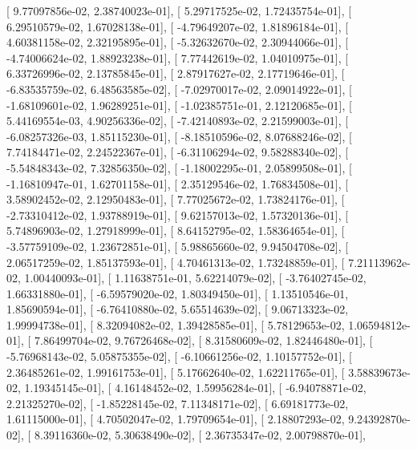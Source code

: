 \documentclass{article}
\begin{document}
       [  9.77097856e-02,   2.38740023e-01],
       [  5.29717525e-02,   1.72435754e-01],
       [  6.29510579e-02,   1.67028138e-01],
       [ -4.79649207e-02,   1.81896184e-01],
       [  4.60381158e-02,   2.32195895e-01],
       [ -5.32632670e-02,   2.30944066e-01],
       [ -4.74006624e-02,   1.88923238e-01],
       [  7.77442619e-02,   1.04010975e-01],
       [  6.33726996e-02,   2.13785845e-01],
       [  2.87917627e-02,   2.17719646e-01],
       [ -6.83535759e-02,   6.48563585e-02],
       [ -7.02970017e-02,   2.09014922e-01],
       [ -1.68109601e-02,   1.96289251e-01],
       [ -1.02385751e-01,   2.12120685e-01],
       [  5.44169554e-03,   4.90256336e-02],
       [ -7.42140893e-02,   2.21599003e-01],
       [ -6.08257326e-03,   1.85115230e-01],
       [ -8.18510596e-02,   8.07688246e-02],
       [  7.74184471e-02,   2.24522367e-01],
       [ -6.31106294e-02,   9.58288340e-02],
       [ -5.54848343e-02,   7.32856350e-02],
       [ -1.18002295e-01,   2.05899508e-01],
       [ -1.16810947e-01,   1.62701158e-01],
       [  2.35129546e-02,   1.76834508e-01],
       [  3.58902452e-02,   2.12950483e-01],
       [  7.77025672e-02,   1.73824176e-01],
       [ -2.73310412e-02,   1.93788919e-01],
       [  9.62157013e-02,   1.57320136e-01],
       [  5.74896903e-02,   1.27918999e-01],
       [  8.64152795e-02,   1.58364654e-01],
       [ -3.57759109e-02,   1.23672851e-01],
       [  5.98865660e-02,   9.94504708e-02],
       [  2.06517259e-02,   1.85137593e-01],
       [  4.70461313e-02,   1.73248859e-01],
       [  7.21113962e-02,   1.00440093e-01],
       [  1.11638751e-01,   5.62214079e-02],
       [ -3.76402745e-02,   1.66331880e-01],
       [ -6.59579020e-02,   1.80349450e-01],
       [  1.13510546e-01,   1.85690594e-01],
       [ -6.76410880e-02,   5.65514639e-02],
       [  9.06713323e-02,   1.99994738e-01],
       [  8.32094082e-02,   1.39428585e-01],
       [  5.78129653e-02,   1.06594812e-01],
       [  7.86499704e-02,   9.76726468e-02],
       [  8.31580609e-02,   1.82446480e-01],
       [ -5.76968143e-02,   5.05875355e-02],
       [ -6.10661256e-02,   1.10157752e-01],
       [  2.36485261e-02,   1.99161753e-01],
       [  5.17662640e-02,   1.62211765e-01],
       [  3.58839673e-02,   1.19345145e-01],
       [  4.16148452e-02,   1.59956284e-01],
       [ -6.94078871e-02,   2.21325270e-02],
       [ -1.85228145e-02,   7.11348171e-02],
       [  6.69181773e-02,   1.61115000e-01],
       [  4.70502047e-02,   1.79709654e-01],
       [  2.18807293e-02,   9.24392870e-02],
       [  8.39116360e-02,   5.30638490e-02],
       [  2.36735347e-02,   2.00798870e-01],
\end{document}
